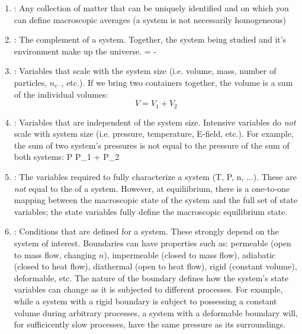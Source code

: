 \documentclass[12pt]{article}
\begin{document}
\begin{enumerate}
\item {}: Any collection of matter that can be uniquely identified and on which you can define macroscopic averages (a system is not necessarily homogeneous)
\item {}: The complement of a system. Together, the system being studied and it's environment make up the universe. 
\eqs
\text{[environment]} = \text{[universe]} - \text{[system]}
\eqe
\item {}: Variables that scale with the system size (i.e. volume, mass, number of particles, $n_{e^-}$, etc.).  If we bring two containers together, the volume is a sum of the individual volumes:
\begin{equation}
V = V_1 + V_2
\end{equation}
\item {}: Variables that are independent of the system size. Intensive variables do \emph{not} scale with system size (i.e. pressure, temperature, E-field, etc.).  For example, the sum of two system's pressures is not equal to the pressure of the sum of both systems:
\eqs
P \neq P_1 + P_2
\eqe
\item {}: The variables required to fully characterize a system (T, P, n, ...).  These are \emph{not} equal to the  of a system. However, at equiliibrium, there is a one-to-one mapping between the macroscopic state of the system and the full set of state variables; the state variables fully define the macroscopic equilibrium state.
\item {}: Conditions that are defined for a system.  These strongly depend on the system of interest. Boundaries can have properties such as: permeable (open to mass flow, changing $n$), impermeable (closed to mass flow), adiabatic (closed to heat flow), diathermal (open to heat flow), rigid (constant volume), deformable, etc. The nature of the boundary defines how the system's state variables can change as it is subjected to different processes. For example, while a system with a rigid boundary is subject to possessing a constant volume during arbitrary processes, a system with a deformable boundary will, for sufficicently slow processes, have the same pressure as its surroundings.
\end{enumerate}
\end{document}
